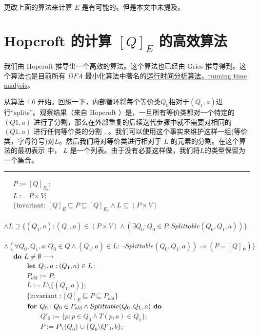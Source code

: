 更改上面的算法来计算 $E$ 是有可能的。但是本文中未提及。

\section{Hopcroft 的计算 $[Q]_E$ 的高效算法}

我们由 Hopcroft 推导出一个高效的算法。这个算法也已经由 Gries \cite{Grie73} 推导得到。这个算法也是目前所有 $DFA$ 最小化算法中著名的\uline{运行时间分析算法，running time analysis}。

从算法 4.6 开始。回想一下，内部循环将每个等价类$Q_0$相对于$(Q_1, a)$进行“splits”。观察结果（来自 Hopcroft ）是，一旦所有等价类都对一个特定的 $(Q1,a)$ 进行了分割，那么在外部重复的后续迭代步骤中就不需要对相同的$(Q1,a)$ 进行任何等价类的分割 \cite[pp.190-191]{Hopc71}, \cite[引理 5]{Grie73}。我们可以使用这个事实来维护这样一组(等价类，字母符号)对$L$。然后我们将对等价类进行相对于 $L$ 的元素的分割。在这个算法的最初表示 \cite{Hopc71, Grie73} 中， $L$ 是一个列表。由于没有必要这样做，我们将$L$的类型保留为一个集合。
\\
\rule{\textwidth}{1pt}
\mbox{　} $P:=[Q]_{E_0}$; \\
\mbox{　} $L:=P\times V$; \\
\mbox{　} $ \{ \mbox{invariant: } [Q]_E \sqsubseteq P \sqsubseteq [Q]_{E_0} \land L \subseteq (P \times V) $ \\
\mbox{　　　} $ \land L \supseteq  \{ (Q_1,a) : (Q_1,a) \in (P \times V) \land ( \exists Q_0 : Q_0 \in P : Splittable (Q_0,Q_1,a) ) \} $ \\
\mbox{　　　} $ \land (\forall Q_0,Q_1,a:Q_0 \in Q \land (Q_1,a) \in L : \neg Splittable (Q_0,Q_1,a)) \Rightarrow (P=[Q]_E) \} $ \\
\mbox{　} $ \mbox{\textbf{do }} L \not= \emptyset \longrightarrow $ \\ 
\mbox{　　　} $ \mbox{\textbf{let }} Q_1,a:(Q_1,a) \in L $; \\
\mbox{　　　} $ P_{old} := P $; \\
\mbox{　　　} $ L := L \setminus \{ (Q_1,a) \} $; \\
\mbox{　　　} $ \{  \mbox{invariant }: [Q]_E \sqsubseteq P \sqsubseteq P_{old} \} $ \\
\mbox{　　　} $ \mbox{\textbf{for }} Q_0 : Q_0 \in P_{old} \land Splittable (Q_0,Q_1,a) \mbox{\textbf{ do }} $ \\
\mbox{　　　　　} $ Q'_0 := \{ p:p \in Q_0 \land T(p,a) \in Q_1 \} $; \\
\mbox{　　　　　} $ P:= P \setminus \{ Q_0 \} \cup \{ Q_0 \setminus Q'_0,b \} $;\\
